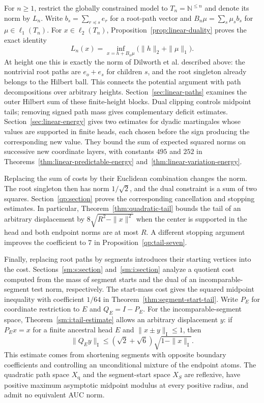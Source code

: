 For $n\ge1$, restrict the globally constrained model to
$T_n=\mathbb N^{\le n}$ and denote its norm by $L_n$. Write
$b_s=\sum_{r\preceq s}e_r$ for a root-path vector and
$B_n\mu=\sum_s\mu_s b_s$ for $\mu\in\ell_1(T_n)$.
For $x\in\ell_2(T_n)$, Proposition~\ref{prop:linear-duality} proves
the exact identity
\[
 L_n(x)=\inf_{x=h+B_n\mu}\bigl(\|h\|_2+\|\mu\|_1\bigr).
\]
At height one this is exactly the norm of Dilworth et al. described
above: the nontrivial root paths are $e_o+e_s$ for children $s$, and
the root singleton already belongs to the Hilbert ball. This connects
the potential argument with path decompositions over arbitrary heights.
Section~\ref{sec:linear-paths} examines the outer Hilbert sum of
these finite-height blocks. Dual clipping controls midpoint tails;
removing signed path mass gives complementary deficit estimates.
Section~\ref{sec:linear-energy} gives two estimates for dyadic martingales
whose values are supported in finite heads, each chosen before the sign
producing the corresponding new value. They bound the sum of expected
squared norms on successive new coordinate layers, with constants $495$
and $252$ in
Theorems~\ref{thm:linear-predictable-energy} and~\ref{thm:linear-variation-energy}.

Replacing the sum of costs by their Euclidean combination changes the
norm. The root singleton then has norm $1/\sqrt2$, and the dual
constraint is a sum of two squares. Section~\ref{qp:section} proves
the corresponding cancellation and stopping estimates. In particular,
Theorem~\ref{thm:quadratic-tail} bounds the tail of an arbitrary
displacement by $8\sqrt{R^2-\|x\|^2}$ when the center is supported
in the head and both endpoint norms are at most $R$. A different stopping
argument improves the coefficient to $7$ in Proposition~\ref{qp:tail-seven}.

Finally, replacing root paths by segments introduces their starting
vertices into the cost. Sections~\ref{sm:s:section} and~\ref{sm:i:section}
analyze a quotient cost computed from the mass of segment starts and
the dual of an incomparable-segment test norm, respectively. The
start-mass cost gives the squared midpoint inequality
with coefficient $1/64$ in Theorem~\ref{thm:segment-start-tail}.
Write $P_E$ for coordinate restriction to $E$ and $Q_E=I-P_E$.
For the incomparable-segment space, Theorem~\ref{sm:i:tail-estimate}
allows an arbitrary displacement $y$: if $P_Ex=x$ for a finite
ancestral head $E$ and $\|x\pm y\|_{\mathrm I}\le1$, then
\[
 \|Q_Ey\|_{\mathrm I}
 \le(\sqrt2+\sqrt6)\sqrt{1-\|x\|_{\mathrm I}}.
\]
This estimate comes from shortening segments with opposite boundary
coefficients and controlling an unconditional mixture of the endpoint
atoms. The quadratic path space $X_{\mathrm q}$ and the segment-start
space $X_S$ are reflexive, have positive maximum asymptotic midpoint
modulus at every positive radius, and admit no equivalent AUC norm.

